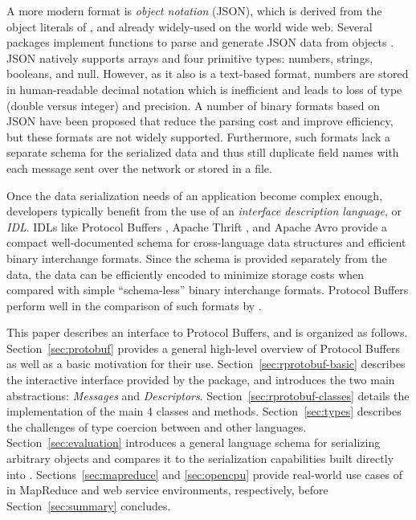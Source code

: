 \documentclass[article]{jss}
\begin{document}
A more modern format is \emph{ object notation}
(JSON), which is derived from the object literals of
, and already widely-used on the world wide web.
Several  packages implement functions to parse and
generate JSON data from  objects
\citep{rjson,RJSONIO,jsonlite}.  JSON natively supports arrays
and four primitive types: numbers, strings, booleans, and
null. However, as it also is a text-based format, numbers are stored
in human-readable decimal notation which is inefficient and leads to
loss of type (double versus integer) and precision.  A number of
binary formats based on JSON have been proposed that reduce the
parsing cost and improve efficiency, but these formats are not widely
supported.  Furthermore, such formats lack a separate schema for the
serialized data and thus still duplicate field names with each message
sent over the network or stored in a file.

Once the data serialization needs of an application become complex
enough, developers typically benefit from the use of an
\emph{interface description language}, or \emph{IDL}.  IDLs like
Protocol Buffers \citep{protobuf}, Apache Thrift \citep{Apache:Thrift}, and Apache Avro \citep{Apache:Avro}
provide a compact well-documented schema for cross-language data
structures and efficient binary interchange formats.  Since the schema
is provided separately from the data, the data can be
efficiently encoded to minimize storage costs when
compared with simple ``schema-less'' binary interchange formats.
Protocol Buffers perform well in the comparison of such formats by
\citet{Sumaray:2012:CDS:2184751.2184810}.

This paper describes an  interface to Protocol Buffers,
and is organized as follows. Section~\ref{sec:protobuf}
provides a general high-level overview of Protocol Buffers as well as a basic
motivation for their use.
Section~\ref{sec:rprotobuf-basic} describes the interactive  interface
provided by the  package, and introduces the two main abstractions:
\emph{Messages} and \emph{Descriptors}.  Section~\ref{sec:rprotobuf-classes}
details the implementation of the main 4 classes and methods.
Section~\ref{sec:types} describes the challenges of type coercion
between  and other languages.  Section~\ref{sec:evaluation} introduces a
general  language schema for serializing arbitrary  objects and compares it to
the serialization capabilities built directly into .  Sections~\ref{sec:mapreduce}
and \ref{sec:opencpu} provide real-world use cases of 
in MapReduce and web service environments, respectively, before
Section~\ref{sec:summary} concludes.
\end{document}
